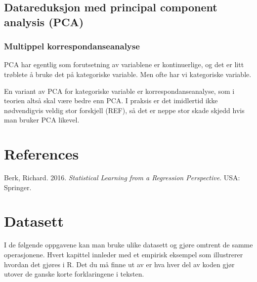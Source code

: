 \documentclass[
  letterpaper,
  DIV=11,
  numbers=noendperiod]{scrreprt}
\newlength{\cslhangindent}
\newlength{\cslentryspacingunit} %
\newenvironment{CSLReferences}[2] %
 {%
  \setlength{\parindent}{0pt}
  \ifodd #1
  \let\oldpar\par
  \def\par{\hangindent=\cslhangindent\oldpar}
  \fi
  \setlength{\parskip}{#2\cslentryspacingunit}
 }%
 {}
\theoremstyle{definition}
\theoremstyle{remark}
\begin{document}
\hypertarget{datareduksjon-med-principal-component-analysis-pca}{%
\section{Datareduksjon med principal component analysis
(PCA)}\label{datareduksjon-med-principal-component-analysis-pca}}

\hypertarget{multippel-korrespondanseanalyse}{%
\subsection{Multippel
korrespondanseanalyse}\label{multippel-korrespondanseanalyse}}

PCA har egentlig som forutsetning av variablene er kontinuerlige, og det
er litt trøblete å bruke det på kategoriske variable. Men ofte har vi
kategoriske variable.

En variant av PCA for kategoriske variable er korrespondanseanalyse, som
i teorien altså skal være bedre enn PCA. I praksis er det imidlertid
ikke nødvendigvis veldig stor forskjell (REF), så det er neppe stor
skade skjedd hvis man bruker PCA likevel.


\hypertarget{references}{%
\chapter*{References}\label{references}}


\hypertarget{refs}{}
\begin{CSLReferences}{1}{0}
\leavevmode{}%
Berk, Richard. 2016. \emph{Statistical Learning from a Regression
Perspective}. USA: Springer.

\end{CSLReferences}

\appendix
{}

\hypertarget{datasett}{%
\chapter{Datasett}\label{datasett}}

I de følgende oppgavene kan man bruke ulike datasett og gjøre omtrent de
samme operasjonene. Hvert kapittel innleder med et empirisk eksempel som
illustrerer hvordan det gjøres i R. Det du må finne ut av er hva hver
del av koden gjør utover de ganske korte forklaringene i teksten.
\end{document}
